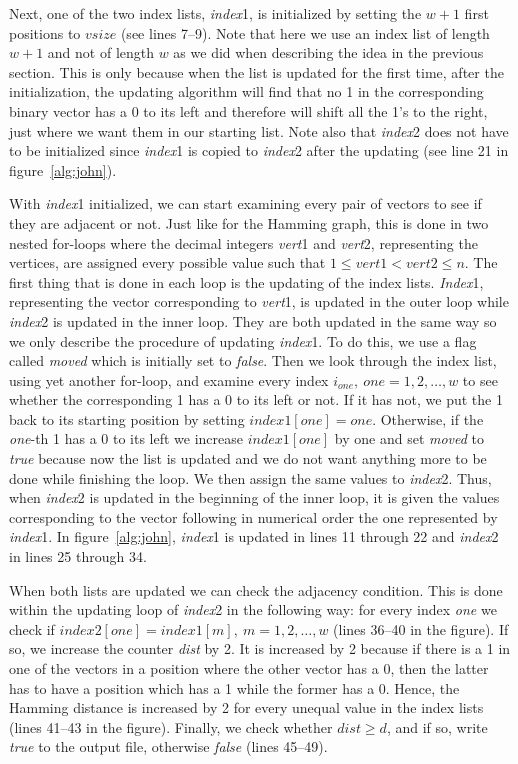 Next, one of the two index lists, {\em index\/}1, is initialized by
setting the $w+1$ first positions to $vsize$ (see lines 7--9). Note
that here we use an index list of length $w+1$ and not of length
$w$ as we did when describing the idea in the previous section. This
is only because when the list is updated for the first time, after the
initialization, the updating algorithm will find that no 1 in the
corresponding binary vector has a 0 to its left and therefore will shift
all the 1's to the right, just where we want them in our starting list.
Note also that {\em index}2 does not have to be initialized since {\em
index}1 is copied to {\em index}2 after the updating (see line 21 in
figure~\ref{alg:john}).

With {\em index\/}1 initialized, we can start examining every pair of
vectors to see if they are adjacent or not. Just like for the Hamming
graph, this is done in two nested for-loops where the decimal integers
{\em vert\/}1 and {\em vert\/}2, representing the vertices, are
assigned every possible value such that $1 \leq vert1 < vert2 \leq n$.
The first thing that is done in each loop is the updating of the index
lists. {\em Index\/}1, representing the vector corresponding to {\em
vert\/}1, is updated in the outer loop while {\em index\/}2 is updated
in the inner loop. They are both updated in the same way so we only
describe the procedure of updating {\em index\/}1. To do this, we use a
flag called {\em moved} which is initially set to {\em false}. Then we
look through the index list, using yet another for-loop, and examine
every index $i_{one},\ one = 1,2,\ldots,w$ to see whether the
corresponding 1 has a 0 to its left or not. If it has not, we put the
1 back to its starting position by setting $index1[one] = one$.
Otherwise, if the {\em one}-th 1 has a 0 to its left we increase
$index1[one]$ by one and set {\em moved} to {\em true} because now the
list is updated and we do not want anything more to be done while
finishing the loop. We then assign the same values to {\em index\/}2.
Thus, when {\em index\/}2 is updated in the beginning of the inner loop, it is
given the values corresponding to the vector following in numerical
order the one represented by {\em index\/}1. In figure~\ref{alg:john},
{\em index\/}1 is updated in lines 11 through 22 and {\em index\/}2 in
lines 25 through 34.

When both lists are updated we can check the adjacency condition.
This is done within the updating loop of {\em index\/}2 in the
following way: for every index {\em one} we check if
$index2[one] = index1[m],\ m = 1,2,\ldots ,w$ (lines 36--40 in the
figure). If so, we increase the counter {\em dist} by 2. It is
increased by 2 because if there is a 1 in one of the vectors in a
position where the other vector has a 0, then the latter has to have a
position which has a 1 while the former has a 0. Hence, the Hamming distance
is increased by 2 for every unequal value in the index lists
(lines 41--43 in the figure).  Finally, we check whether $dist \geq d$, and if
so, write {\em true} to the output file, otherwise {\em false} (lines
45--49).

